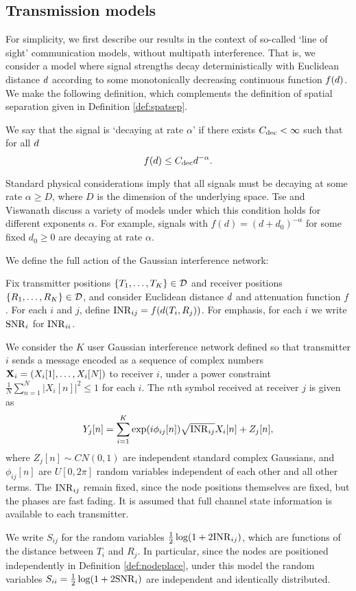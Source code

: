 \documentclass[journal]{IEEEtran}
\begin{document}
\subsection{Transmission models}
%
For simplicity, we first describe our results in the context of so-called `line of sight'
communication models, without multipath interference. That is,
we consider a model where signal strengths decay 
deterministically with Euclidean distance $d$ according to
some monotonically decreasing continuous
function $f(d)$. 
We make the following definition, which complements the definition of
spatial separation given in Definition \ref{def:spatsep}.
%
\begin{definition} \label{def:decay}
We say that the signal is `decaying at rate $\alpha$' if there exists $C_{\rm{dec}} < \infty$
such that for all $d$
\begin{equation} \label{eq:decay}
 f(d)  \leq C_{\rm{dec}} d^{-\alpha}.\end{equation}
\end{definition}
%
Standard physical considerations imply that all signals must be decaying 
at some rate $\alpha \geq D$, where $D$ is the dimension of the underlying space.
Tse and Viswanath \cite[Section 2.1]{tse} discuss a variety of models under which this 
condition holds for different exponents $\alpha$. For example,  
signals with $f(d) = (d + d_0)^{-\alpha}$ for
some fixed $d_0 \geq 0$ are decaying at rate $\alpha$.

We define the full action of the Gaussian interference network:
%
\begin{definition}
\label{def:transprot}
Fix transmitter positions $\{ T_1, \ldots, T_K \} 
\in {\mathcal{D}}$ and receiver positions
$\{R_1, \ldots, R_K \} \in {\mathcal{D}}$, and consider Euclidean distance $d$ and attenuation function $f$.
For each $i$ and $j$, define 
${\rm{INR}}_{ij} = f(d(T_i,R_j))$.
For emphasis, for each $i$ we write ${\rm{SNR}}_i$ for ${\rm{INR}}_{ii}$.

We consider the $K$ user Gaussian interference network defined so that
transmitter $i$ sends a message encoded as a sequence of complex
numbers ${\mathbf{ X}}_i = (X_i[1], \ldots, X_i[N])$ to receiver $i$, under a power constraint
$\frac{1}{N} \sum_{n=1}^N |X_i[n]|^2
 \leq 1$ for each $i$. The $n$th symbol received at receiver $j$ is given as
\begin{equation} \label{eq:transmod} Y_j[n] = \sum_{i=1}^K \exp(i \phi_{ij}[n]) 
\sqrt{{\rm{INR}}_{ij}} X_i[n]  + Z_j[n],
\end{equation}
where $Z_j[n] \sim CN(0,1)$ 
are independent standard complex Gaussians, and $\phi_{ij}[n]$ are
 $U[0,2\pi]$ random variables independent of 
each other and all other terms.
The ${\rm{INR}}_{ij}$ remain fixed, since the node positions themselves are fixed,
but the phases are fast fading. It is assumed that full channel
state information is available to each transmitter.
\end{definition}
%
We write $S_{ij}$ for the random variables $\frac{1}{2} \log(1 + 2 {\rm{INR}}_{ij})$,
which  are functions of the distance
between $T_i$ and $R_j$.
 In particular, since the nodes are positioned
independently in Definition \ref{def:nodeplace}, under this model
the random variables $S_{ii} = \frac{1}{2} \log(1 + 2 {\rm{SNR}}_i)$ are independent
and identically distributed. 
\end{document}
